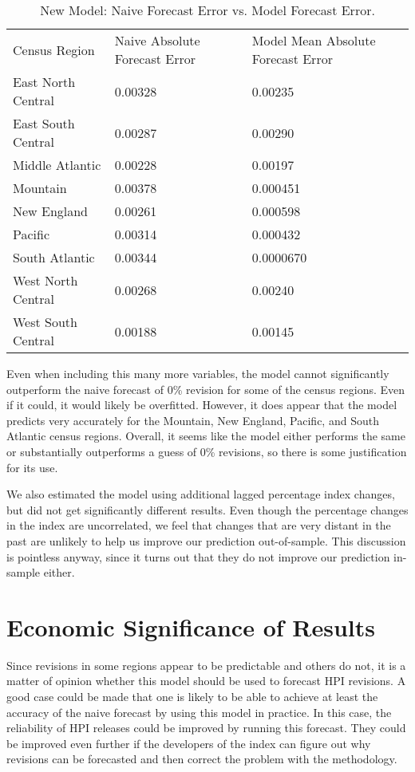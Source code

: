 \documentclass[AER]{AEA}
\begin{document}
\begin{table}
\caption{New Model: Naive Forecast Error vs. Model Forecast Error.}

\begin{tabular}{lll}
Census Region & Naive Absolute Forecast Error & Model Mean Absolute Forecast Error \\ 
East North Central & 0.00328 & 0.00235 \\ 
East South Central & 0.00287 & 0.00290 \\
Middle Atlantic & 0.00228 & 0.00197 \\
Mountain & 0.00378 & 0.000451 \\
New England & 0.00261 & 0.000598 \\
Pacific & 0.00314 & 0.000432 \\
South Atlantic & 0.00344 & 0.0000670 \\
West North Central & 0.00268 & 0.00240 \\
West South Central & 0.00188 & 0.00145
\end{tabular}
\end{table}

Even when including this many more variables, the model cannot significantly outperform the naive forecast of 0\% revision for some of the census regions. Even if it could, it would likely be overfitted. However, it does appear that the model predicts very accurately for the Mountain, New England, Pacific, and South Atlantic census regions. Overall, it seems like the model either performs the same or substantially outperforms a guess of 0\% revisions, so there is some justification for its use.

We also estimated the model using additional lagged percentage index changes, but did not get significantly different results. Even though the percentage  changes in the index are uncorrelated, we feel that changes that are very distant in the past are unlikely to help us improve our prediction out-of-sample. This discussion is pointless anyway, since it turns out that they do not improve our prediction in-sample either.

\section{Economic Significance of Results}

Since revisions in some regions appear to be predictable and others do not, it is a matter of opinion whether this model should be used to forecast HPI revisions. A good case could be made that one is likely to be able to achieve at least the accuracy of the naive forecast by using this model in practice. In this case, the reliability of HPI releases could be improved by running this forecast. They could be improved even further if the developers of the index can figure out why revisions can be forecasted and then correct the problem with the methodology.
\end{document}
